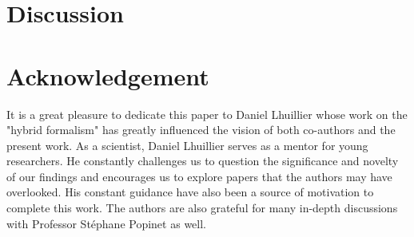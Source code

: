 \documentclass[11pt]{My_preprint}
\begin{document}
\section{Discussion}
\label{sec:conclusion}

%



\section*{Acknowledgement}
It is a great pleasure to dedicate this paper to Daniel Lhuillier whose work on the "hybrid formalism" has greatly influenced the vision of both co-authors and the present work. 
As a scientist, Daniel Lhuillier serves as a mentor for young researchers. 
He constantly challenges us to question the significance and novelty of our findings and encourages us to explore papers that the authors may have overlooked.
His constant guidance have also been a source of motivation to complete this work.
The authors are also grateful for many in-depth discussions with Professor St\'ephane Popinet as well. 



\appendix



% 
% 
% 


\end{document}
